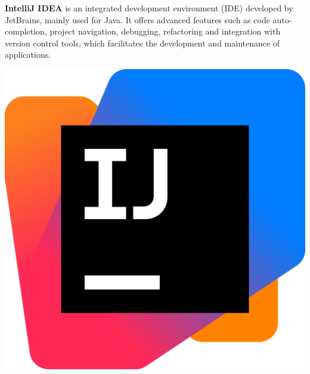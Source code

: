 \noindent
\begin{minipage}{.7\textwidth}%
    \textbf{IntelliJ IDEA} is an integrated development environment (IDE) developed by JetBrains, mainly used for Java. It offers advanced features such as code auto-completion, project navigation, debugging, refactoring and integration with version control tools, which facilitates the development and maintenance of applications.
\end{minipage}%
\hfill
\begin{minipage}{.20\textwidth}%
\includegraphics[width=.8\textwidth]{images/intellij}
 \end{minipage} \\ \\ \\


